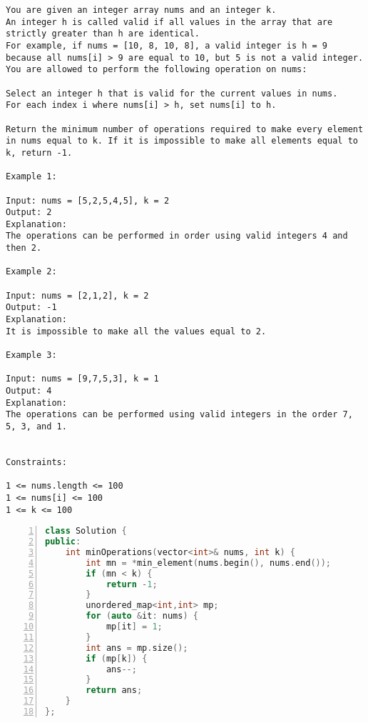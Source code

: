 \begin{figure*}
\centering
\footnotesize
\begin{lstlisting}
You are given an integer array nums and an integer k.
An integer h is called valid if all values in the array that are strictly greater than h are identical.
For example, if nums = [10, 8, 10, 8], a valid integer is h = 9 because all nums[i] > 9 are equal to 10, but 5 is not a valid integer.
You are allowed to perform the following operation on nums:

Select an integer h that is valid for the current values in nums.
For each index i where nums[i] > h, set nums[i] to h.

Return the minimum number of operations required to make every element in nums equal to k. If it is impossible to make all elements equal to k, return -1.
 
Example 1:

Input: nums = [5,2,5,4,5], k = 2
Output: 2
Explanation:
The operations can be performed in order using valid integers 4 and then 2.

Example 2:

Input: nums = [2,1,2], k = 2
Output: -1
Explanation:
It is impossible to make all the values equal to 2.

Example 3:

Input: nums = [9,7,5,3], k = 1
Output: 4
Explanation:
The operations can be performed using valid integers in the order 7, 5, 3, and 1.

 
Constraints:

1 <= nums.length <= 100 
1 <= nums[i] <= 100
1 <= k <= 100
\end{lstlisting}
\label{lst:problem-motiv}
\end{figure*}

\begin{figure*}
\centering
\begin{lstlisting}[breaklines=true, language=C++, frame=shadowbox, numbers=left,]
class Solution {
public:
    int minOperations(vector<int>& nums, int k) {
        int mn = *min_element(nums.begin(), nums.end()); 
        if (mn < k) {
            return -1; 
        }
        unordered_map<int,int> mp; 
        for (auto &it: nums) {
            mp[it] = 1; 
        }
        int ans = mp.size(); 
        if (mp[k]) {
            ans--; 
        }
        return ans; 
    }
};
\end{lstlisting}
\label{lst:cpp-motiv}
\end{figure*}
